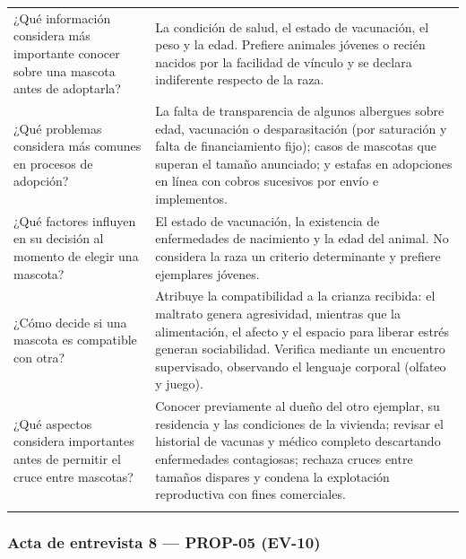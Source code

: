 \documentclass[journal,onecolumn]{IEEEtran}
\begin{document}
{\begin{longtable}{@{}p{5.6cm} p{9.4cm}@{}}
			¿Qué información considera más importante conocer sobre una mascota antes de adoptarla? & La condición de salud, el estado de vacunación, el peso y la edad. Prefiere animales jóvenes o recién nacidos por la facilidad de vínculo y se declara indiferente respecto de la raza. \\ \addlinespace
			
			¿Qué problemas considera más comunes en procesos de adopción? & La falta de transparencia de algunos albergues sobre edad, vacunación o desparasitación (por saturación y falta de financiamiento fijo); casos de mascotas que superan el tamaño anunciado; y estafas en adopciones en línea con cobros sucesivos por envío e implementos. \\ \addlinespace
			
			¿Qué factores influyen en su decisión al momento de elegir una mascota? & El estado de vacunación, la existencia de enfermedades de nacimiento y la edad del animal. No considera la raza un criterio determinante y prefiere ejemplares jóvenes. \\ \addlinespace
			
			¿Cómo decide si una mascota es compatible con otra? & Atribuye la compatibilidad a la crianza recibida: el maltrato genera agresividad, mientras que la alimentación, el afecto y el espacio para liberar estrés generan sociabilidad. Verifica mediante un encuentro supervisado, observando el lenguaje corporal (olfateo y juego). \\ \addlinespace
			
			¿Qué aspectos considera importantes antes de permitir el cruce entre mascotas? & Conocer previamente al dueño del otro ejemplar, su residencia y las condiciones de la vivienda; revisar el historial de vacunas y médico completo descartando enfermedades contagiosas; rechaza cruces entre tamaños dispares y condena la explotación reproductiva con fines comerciales. \\ \addlinespace
			
		\end{longtable}
	}
	
	
	\subsubsection*{Acta de entrevista 8 --- PROP-05 (EV-10)}
	
\end{document}
